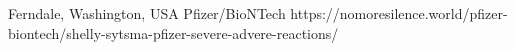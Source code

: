           {Ferndale, Washington, USA}
          {}
          {Pfizer/BioNTech}
          {}
          {
          }
          {https://nomoresilence.world/pfizer-biontech/shelly-sytsma-pfizer-severe-advere-reactions/}



